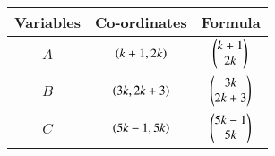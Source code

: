\begin{tabular}[12pt]{ |c| c| c|}
\hline
\textbf{Variables} & \textbf{Co-ordinates} & \textbf{Formula} \\
\hline
$A$ & $\left(k + 1, 2k\right)$ & $\begin{pmatrix}k + 1\\2k\end{pmatrix}$\\
\hline
$B$ & $\left(3k, 2k + 3\right)$ & $\begin{pmatrix}3k\\2k + 3\end{pmatrix}$\\
\hline
$C$ & $\left(5k - 1, 5k\right)$ & $\begin{pmatrix}5k - 1\\5k\end{pmatrix}$\\
\hline
\end{tabular}
